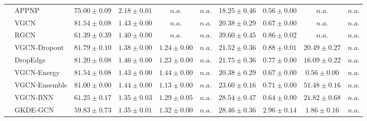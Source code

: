 \begin{table*}[!h]
{\begin{tabular}{ll|cccc|cccc}
        & APPNP & ${75.00\scriptscriptstyle \pm 0.09}$ & ${{2.18}\scriptscriptstyle \pm 0.01}$ & $n.a.$ & $n.a.$ & ${18.25\scriptscriptstyle \pm 0.46}$ & ${0.56\scriptscriptstyle \pm 0.00}$ & $n.a.$ & $n.a.$\\
        & VGCN & ${81.54\scriptscriptstyle \pm 0.08}$ & ${1.43\scriptscriptstyle \pm 0.00}$ & $n.a.$ & $n.a.$ & ${20.38\scriptscriptstyle \pm 0.29}$ & ${0.67\scriptscriptstyle \pm 0.00}$ & $n.a.$ & $n.a.$\\
        & RGCN & ${61.39\scriptscriptstyle \pm 0.39}$ & ${1.40\scriptscriptstyle \pm 0.00}$ & $n.a.$ & $n.a.$ & ${39.60\scriptscriptstyle \pm 0.45}$ & ${0.86\scriptscriptstyle \pm 0.02}$ & $n.a.$ & $n.a.$\\
        & VGCN-Dropout & ${\mathbf{81.79}\scriptscriptstyle \pm 0.10}$ & ${1.38\scriptscriptstyle \pm 0.00}$ & ${1.24\scriptscriptstyle \pm 0.00}$ & $n.a.$ & ${21.52\scriptscriptstyle \pm 0.36}$ & ${0.88\scriptscriptstyle \pm 0.01}$ & ${20.49\scriptscriptstyle \pm 0.27}$ & $n.a.$\\
        & DropEdge & ${81.20\scriptscriptstyle \pm 0.08}$ & ${1.46\scriptscriptstyle \pm 0.00}$ & ${1.23\scriptscriptstyle \pm 0.00}$ & $n.a.$ & ${21.75\scriptscriptstyle \pm 0.36}$ & ${0.77\scriptscriptstyle \pm 0.00}$ & ${16.09\scriptscriptstyle \pm 0.22}$ & $n.a.$\\
        & VGCN-Energy & ${81.54\scriptscriptstyle \pm 0.08}$ & ${1.43\scriptscriptstyle \pm 0.00}$ & ${1.44\scriptscriptstyle \pm 0.00}$ & $n.a.$ & ${20.38\scriptscriptstyle \pm 0.29}$ & ${0.67\scriptscriptstyle \pm 0.00}$ & ${0.56\scriptscriptstyle \pm 0.00}$ & $n.a.$\\
        & VGCN-Ensemble & ${81.00\scriptscriptstyle \pm 0.00}$ & ${1.44\scriptscriptstyle \pm 0.00}$ & ${1.13\scriptscriptstyle \pm 0.00}$ & $n.a.$ & ${23.60\scriptscriptstyle \pm 0.16}$ & ${0.71\scriptscriptstyle \pm 0.00}$ & ${{51.48}\scriptscriptstyle \pm 0.16}$ & $n.a.$\\
        & VGCN-BNN & ${61.25\scriptscriptstyle \pm 0.17}$ & ${1.35\scriptscriptstyle \pm 0.03}$ & ${1.29\scriptscriptstyle \pm 0.05}$ & $n.a.$ & ${28.54\scriptscriptstyle \pm 0.47}$ & ${0.64\scriptscriptstyle \pm 0.00}$ & ${21.82\scriptscriptstyle \pm 0.68}$ & $n.a.$\\
        & GKDE-GCN & ${59.83\scriptscriptstyle \pm 0.73}$ & ${1.35\scriptscriptstyle \pm 0.01}$ & ${1.32\scriptscriptstyle \pm 0.00}$ & $n.a.$ & ${28.46\scriptscriptstyle \pm 0.36}$ & ${2.96\scriptscriptstyle \pm 0.14}$ & ${1.86\scriptscriptstyle \pm 0.16}$ & $n.a.$\\

\end{tabular}}
\end{table*}
